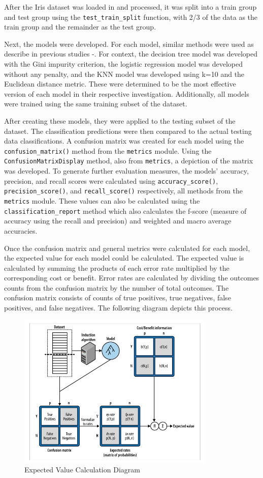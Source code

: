 \documentclass[journal]{IEEEtran}
\begin{document}
After the Iris dataset was loaded in and processed, it was split into a train group and test group using the \lstinline{test_train_split} function, with 2/3 of the data as the train group and the remainder as the test group. 

Next, the models were developed. For each model, similar methods were used as describe in previous studies \cite{b1}-\cite{b3}. For context, the decision tree model was developed with the Gini impurity criterion, the logistic regression model was developed without any penalty, and the KNN model was developed using k=10 and the Euclidean distance metric. These were determined to be the most effective version of each model in their respective investigation. Additionally, all models were trained using the same training subset of the dataset.

After creating these models, they were applied to the testing subset of the dataset. The  classification predictions were then compared to the actual testing data classifications. A confusion matrix was created for each model using the \lstinline{confusion_matrix()} method from the \lstinline{metrics} module. Using the \lstinline{ConfusionMatrixDisplay} method, also from \lstinline{metrics}, a depiction of the matrix was developed. To generate further evaluation measures, the models' accuracy, precision, and recall scores were calculated using \lstinline{accuracy_score()}, \lstinline{precision_score()}, and \lstinline{recall_score()} respectively, all methods from the \lstinline{metrics} module. These values can also be calculated using the \lstinline{classification_report} method which also calculates the f-score (measure of accuracy using the recall and precision) and weighted and macro average accuracies. 

Once the confusion matrix and general metrics were calculated for each model, the expected value for each model could be calculated. The expected value is calculated by summing the products of each error rate multiplied by the corresponding cost or benefit. Error rates are calculated by dividing the outcomes counts from the confusion matrix by the number of total outcomes. The confusion matrix consists of counts of true positives, true negatives, false positives, and false negatives. The following diagram depicts this process. 

\begin{figure}[h!]
\includegraphics[scale=1]{expectedValDiagram.png}
\centering
\caption{Expected Value Calculation Diagram}
\label{fig:expectedValDiagram}
\end{figure}
\end{document}

